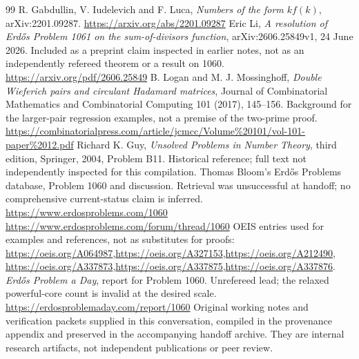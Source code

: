 {\begin{thebibliography}{99}
 R. Gabdullin, V. Iudelevich and F. Luca, \emph{Numbers of the form $kf(k)$}, arXiv:2201.09287.\newline
\url{https://arxiv.org/abs/2201.09287}
 Eric Li, \emph{A resolution of Erd\H{o}s Problem 1061 on the sum-of-divisors function}, arXiv:2606.25849v1, 24 June 2026. Included as a preprint claim inspected in earlier notes, not as an independently refereed theorem or a result on 1060.\newline
\url{https://arxiv.org/pdf/2606.25849}
 B. Logan and M. J. Mossinghoff, \emph{Double Wieferich pairs and circulant Hadamard matrices}, Journal of Combinatorial Mathematics and Combinatorial Computing 101 (2017), 145--156. Background for the larger-pair regression examples, not a premise of the two-prime proof.\newline
\url{https://combinatorialpress.com/article/jcmcc/Volume%20101/vol-101-paper%2012.pdf}
 Richard K. Guy, \emph{Unsolved Problems in Number Theory}, third edition, Springer, 2004, Problem B11. Historical reference; full text not independently inspected for this compilation.
 Thomas Bloom's Erd\H{o}s Problems database, Problem 1060 and discussion. Retrieval was unsuccessful at handoff; no comprehensive current-status claim is inferred.\newline
\url{https://www.erdosproblems.com/1060}\newline
\url{https://www.erdosproblems.com/forum/thread/1060}
 OEIS entries used for examples and references, not as substitutes for proofs:\newline
\url{https://oeis.org/A064987},\quad\url{https://oeis.org/A327153},\quad\url{https://oeis.org/A212490},\newline
\url{https://oeis.org/A337873},\quad\url{https://oeis.org/A337875},\quad\url{https://oeis.org/A337876}.
 \emph{Erd\H{o}s Problem a Day}, report for Problem 1060. Unrefereed lead; the relaxed powerful-core count is invalid at the desired scale.\newline
\url{https://erdosproblemaday.com/report/1060}
 Original working notes and verification packets supplied in this conversation, compiled in the provenance appendix and preserved in the accompanying handoff archive. They are internal research artifacts, not independent publications or peer review.
\end{thebibliography}

}
